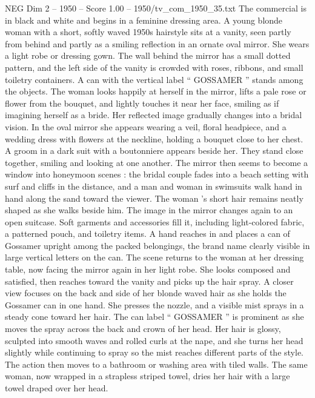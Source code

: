 \begin{textsample}{NEG Dim 2 – 1950 – Score 1.00 – 1950/tv\_com\_1950\_35.txt}  \label{ex:f2_neg_007}
The commercial is in black and white and begins in a feminine dressing area.
A young blonde woman with a short, softly waved 1950s hairstyle sits at a vanity, seen partly from behind and partly as a smiling reflection in an ornate oval mirror.
She wears a light robe or dressing gown.
The wall behind the mirror has a small dotted pattern, and the left side of the vanity is crowded with roses, ribbons, and small toiletry containers.
A can with the vertical label “ GOSSAMER ” stands among the objects.
The woman looks happily at herself in the mirror, lifts a pale rose or flower from the bouquet, and lightly touches it near her face, smiling as if imagining herself as a bride.
Her reflected image gradually changes into a bridal vision.
In the oval mirror she appears wearing a veil, floral headpiece, and a wedding dress with flowers at the neckline, holding a bouquet close to her chest.
A groom in a dark suit with a boutonniere appears beside her.
They stand close together, smiling and looking at one another.
The mirror then seems to become a window into honeymoon scenes : the bridal couple fades into a beach setting with surf and cliffs in the distance, and a man and woman in swimsuits walk hand in hand along the sand toward the viewer.
The woman ’s short hair remains neatly shaped as she walks beside him.
The image in the mirror changes again to an open suitcase.
Soft garments and accessories fill it, including light-colored fabric, a patterned pouch, and toiletry items.
A hand reaches in and places a can of Gossamer upright among the packed belongings, the brand name clearly visible in large vertical letters on the can.
The scene returns to the woman at her dressing table, now facing the mirror again in her light robe.
She looks composed and satisfied, then reaches toward the vanity and picks up the hair spray.
A closer view focuses on the back and side of her blonde waved hair as she holds the Gossamer can in one hand.
She presses the nozzle, and a visible mist sprays in a steady cone toward her hair.
The can label “ GOSSAMER ” is prominent as she moves the spray across the back and crown of her head.
Her hair is glossy, sculpted into smooth waves and rolled curls at the nape, and she turns her head slightly while continuing to spray so the mist reaches different parts of the style.
The action then moves to a bathroom or washing area with tiled walls.
The same woman, now wrapped in a strapless striped towel, dries her hair with a large towel draped over her head.

\end{textsample}
